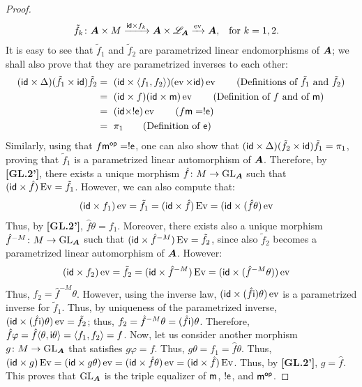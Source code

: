 \begin{proof}
\begin{align*}
&\tilde f_k\colon{\bm{A}}\times M\xrightarrow{\mathsf{id}\times f_k}{\bm{A}}\times\mathscr{L}_{\bm{A}}\xrightarrow{\operatorname{ev}}{\bm{A}},    &&\text{for }k=1,2.
\end{align*}
It is easy to see that $\tilde f_1$ and $\tilde f_2$ are parametrized linear endomorphisms of ${\bm{A}}$; we shall also prove that they are parametrized inverses to each other:
\begin{align*}
(\id\times\Delta)(\tilde f_1\times\id)\tilde f_2&=~(\id\times\<f_1,f_2\>)(\ev\times\id)\ev   \tag{Definitions of $\tilde f_1$ and $\tilde f_2$}\\
&=~(\id\times f)(\id\times\m)\ev                                    \tag{Definition of $f$ and of $\m$}\\
&=~(\id\times!\e)\ev                                                \tag{$f\m=!\e$}\\
&=~\pi_1                                                            \tag{Definition of $\e$}
\end{align*}
Similarly, using that $f\mathsf{m}^{\mathsf{op}}=!\mathsf{e}$, one can also show that $(\mathsf{id}\times\Delta)(\tilde f_2\times\mathsf{id})\tilde f_1=\pi_1$, proving that $\tilde f_1$ is a parametrized linear automorphism of ${\bm{A}}$. Therefore, by \textbf{[GL.2']}, there exists a unique morphism $\hat f\colon M\to\operatorname{GL}_{\bm{A}}$ such that $(\mathsf{id}\times\hat f)\operatorname{Ev}=\tilde f_1$. However, we can also compute that:
\begin{align*}
&(\mathsf{id}\times f_1)\operatorname{ev}=\tilde f_1=(\mathsf{id}\times\hat f)\operatorname{Ev}=(\mathsf{id}\times(\hat f\theta)\operatorname{ev}
\end{align*}
Thus, by \textbf{[GL.2']}, $\hat f\theta=f_1$. Moreover, there exists also a unique morphism $\hat f^{-M}\colon M\to\operatorname{GL}_{\bm{A}}$ such that $(\mathsf{id}\times\hat f^{-M})\operatorname{Ev}=\tilde f_2$, since also $\tilde f_2$ becomes a parametrized linear automorphism of ${\bm{A}}$. However:
\begin{align*}
&(\mathsf{id}\times f_2)\operatorname{ev}=\tilde f_2=(\mathsf{id}\times\hat f^{-M})\operatorname{Ev}= (\mathsf{id}\times(\hat f^{-M}\theta))\operatorname{ev}
\end{align*}
Thus, $f_2=\hat f^{-M}\theta$. However, using the inverse law, $(\mathsf{id}\times(\hat f\mathsf{i})\theta)\operatorname{ev}$ is a parametrized inverse for $\tilde f_1$. Thus, by uniqueness of the parametrized inverse, $(\mathsf{id}\times(\hat f\mathsf{i})\theta)\operatorname{ev}=\tilde f_2$; thus, $f_2=\hat f^{-M}\theta=(\hat f\mathsf{i})\theta$. Therefore, $\hat f\varphi=\hat f\langle\theta,\mathsf{i}\theta\rangle=\langle f_1,f_2\rangle=f$. Now, let us consider another morphism $g\colon M\to\operatorname{GL}_{\bm{A}}$ that satisfies $g\varphi=f$. Thus, $g\theta=f_1=\hat f\theta$. Thus, $(\mathsf{id}\times g)\operatorname{Ev}=(\mathsf{id}\times g\theta)\operatorname{ev}=(\mathsf{id}\times\hat f\theta)\operatorname{ev}=(\mathsf{id}\times\hat f)\operatorname{Ev}$. Thus, by \textbf{[GL.2']}, $g=\hat f$. This proves that $\operatorname{GL}_{\bm{A}}$ is the triple equalizer of $\mathsf{m}$, $!\mathsf{e}$, and $\mathsf{m}^{\mathsf{op}}$.


\end{proof}
